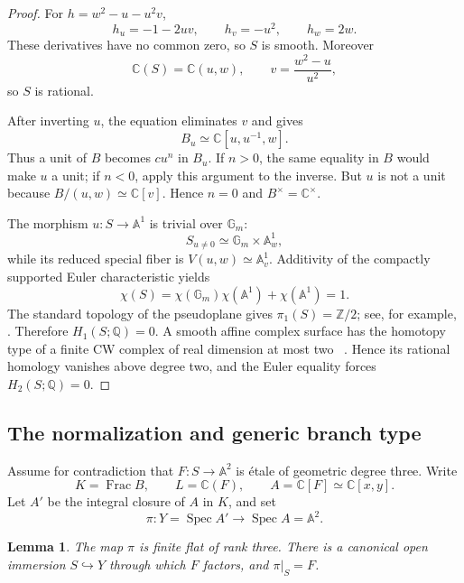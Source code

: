 \documentclass[11pt]{article}
\newtheorem{lemma}[theorem]{Lemma}
\theoremstyle{definition}
\theoremstyle{remark}
\newcommand{\A}{\mathbb A}
\newcommand{\C}{\mathbb C}
\newcommand{\Q}{\mathbb Q}
\newcommand{\Z}{\mathbb Z}
\newcommand{\Gm}{\mathbb G_m}
\newcommand{\Spec}{\operatorname{Spec}}
\newcommand{\Frac}{\operatorname{Frac}}
\begin{document}
\begin{proof}
For \(h=w^2-u-u^2v\),
\[
 h_u=-1-2uv,\qquad h_v=-u^2,\qquad h_w=2w.
\]
These derivatives have no common zero, so \(S\) is smooth.  Moreover
\[
 \C(S)=\C(u,w),\qquad v=\frac{w^2-u}{u^2},
\]
so \(S\) is rational.

After inverting \(u\), the equation eliminates \(v\) and gives
\[
 B_u\simeq\C[u,u^{-1},w].
\]
Thus a unit of \(B\) becomes \(cu^n\) in \(B_u\).  If \(n>0\), the
same equality in \(B\) would make \(u\) a unit; if \(n<0\), apply this
argument to the inverse.  But \(u\) is not a unit because
\(B/(u,w)\simeq\C[v]\).  Hence \(n=0\) and \(B^\times=\C^\times\).

The morphism \(u:S\to\A^1\) is trivial over \(\Gm\):
\[
 S_{u\ne0}\simeq\Gm\times\A^1_w,
\]
while its reduced special fiber is \(V(u,w)\simeq\A^1_v\).  Additivity
of the compactly supported Euler characteristic yields
\[
 \chi(S)=\chi(\Gm)\chi(\A^1)+\chi(\A^1)=1.
\]
The standard topology of the pseudoplane gives
\(\pi_1(S)=\Z/2\); see, for example,
\cite[\S2 and Example \(S(k,r,a)\)]{DuboulozPalka}.
Therefore \(H_1(S;\Q)=0\).  A smooth affine complex surface has the
homotopy type of a finite CW complex of real dimension at most two
~\cite{Hamm}.  Hence its rational homology vanishes above degree two,
and the Euler equality forces \(H_2(S;\Q)=0\).
\end{proof}

\subsection{The normalization and generic branch type}

Assume for contradiction that \(F:S\to\A^2\) is \'etale of geometric
degree three.  Write
\[
 K=\Frac B,\qquad L=\C(F),\qquad A=\C[F]\simeq\C[x,y].
\]
Let \(A'\) be the integral closure of \(A\) in \(K\), and set
\[
 \pi:Y=\Spec A'\longrightarrow\Spec A=\A^2.
\]

\begin{lemma}\label{lem:normalization}
The map \(\pi\) is finite flat of rank three.  There is a canonical open
immersion \(S\hookrightarrow Y\) through which \(F\) factors, and
\(\pi|_S=F\).
\end{lemma}
\end{document}
